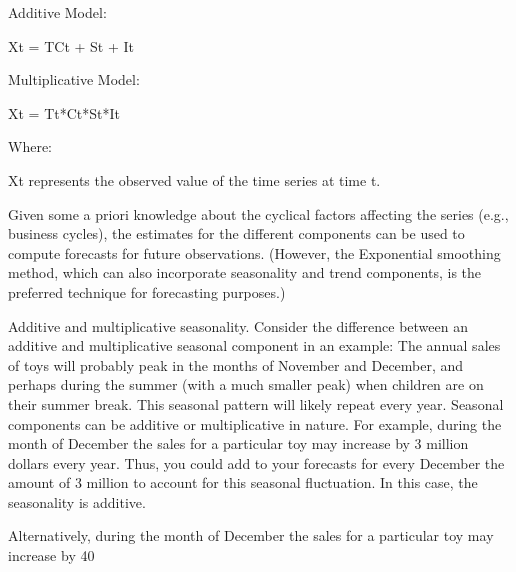 Additive Model:

Xt = TCt + St + It

Multiplicative Model:

Xt = Tt*Ct*St*It

Where:

Xt represents the observed value of the time series at time t.

Given some a priori knowledge about the cyclical factors affecting the series (e.g., business cycles), the estimates for the different components can be used to compute forecasts for future observations. (However, the Exponential smoothing method, which can also incorporate seasonality and trend components, is the preferred technique for forecasting purposes.)

Additive and multiplicative seasonality. Consider the difference between an additive and multiplicative seasonal component in an example: The annual sales of toys will probably peak in the months of November and December, and perhaps during the summer (with a much smaller peak) when children are on their summer break. This seasonal pattern will likely repeat every year. Seasonal components can be additive or multiplicative in nature. For example, during the month of December the sales for a particular toy may increase by 3 million dollars every year. Thus, you could add to your forecasts for every December the amount of 3 million to account for this seasonal fluctuation. In this case, the seasonality is additive.

Alternatively, during the month of December the sales for a particular toy may increase by 40%

